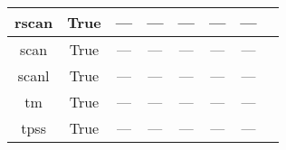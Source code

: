 \begin{tabular}{|c|c|c|c|c|c|c|l|}
    rscan &                  True &           --- &           --- &           --- &            --- &        --- &                                  \cite{Bartok2019_161101} \\ \hline
     scan &                  True &           --- &           --- &           --- &            --- &        --- &                                     \cite{Sun2015_036402} \\ \hline
    scanl &                  True &           --- &           --- &           --- &            --- &        --- &   \cite{Mejia2017_052512,Mejia2018_115161,Sun2015_036402} \\ \hline
       tm &                  True &           --- &           --- &           --- &            --- &        --- &                                     \cite{Tao2016_073001} \\ \hline
     tpss &                  True &           --- &           --- &           --- &            --- &        --- &                     \cite{Tao2003_146401,Perdew2004_6898} \\ \hline
\end{tabular}